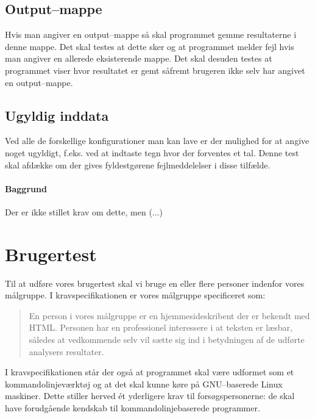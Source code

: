 \documentclass[a4paper,oneside,article]{memoir}
\begin{document}
\section{Output--mappe}
Hvis man angiver en output--mappe så skal programmet gemme
resultaterne i denne mappe. Det skal testes at dette sker og at
programmet melder fejl hvis man angiver en allerede eksisterende
mappe. Det skal desuden testes at programmet viser hvor resultatet er
gemt såfremt brugeren ikke selv har angivet en output--mappe.

\section{Ugyldig inddata}
Ved alle de forskellige konfigurationer man kan lave er der mulighed
for at angive noget ugyldigt, f.eks. ved at indtaste tegn hvor der
forventes et tal. Denne test skal afdække om der gives fyldestgørene
fejlmeddelelser i disse tilfælde.



\subsubsection{Baggrund}
Der er ikke stillet krav om dette, men (...)

\chapter{Brugertest}

Til at udføre vores brugertest skal vi bruge en eller flere personer
indenfor vores målgruppe. I kravspecifikationen er vores målgruppe
specificeret som:
\begin{quote}
En person i vores målgruppe er en hjemmesideskribent der er bekendt
med HTML. Personen har en professionel interessere i at teksten er
læsbar, således at vedkommende selv vil sætte sig ind i betydningen af
de udførte analysers resultater.
\end{quote}

I kravspecifikationen står der også at programmet skal være udformet
som et kommandolinjeværktøj og at det skal kunne køre på GNU--baserede
Linux maskiner. Dette stiller herved ét yderligere krav til
forsøgspersonerne: de skal have forudgående kendskab til
kommando\-linje\-baserede programmer.
\end{document}
